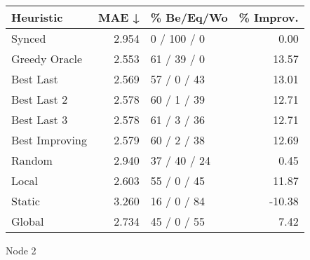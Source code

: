 \begin{tabular}{lrlr}
\toprule
\textbf{Heuristic} & \textbf{MAE ↓} & \textbf{\% Be/Eq/Wo} & \textbf{\% Improv.} \\
\midrule
            Synced &          2.954 &          0 / 100 / 0 &                0.00 \\
     Greedy Oracle &          2.553 &          61 / 39 / 0 &               13.57 \\
         Best Last &          2.569 &          57 / 0 / 43 &               13.01 \\
       Best Last 2 &          2.578 &          60 / 1 / 39 &               12.71 \\
       Best Last 3 &          2.578 &          61 / 3 / 36 &               12.71 \\
    Best Improving &          2.579 &          60 / 2 / 38 &               12.69 \\
            Random &          2.940 &         37 / 40 / 24 &                0.45 \\
             Local &          2.603 &          55 / 0 / 45 &               11.87 \\
            Static &          3.260 &          16 / 0 / 84 &              -10.38 \\
            Global &          2.734 &          45 / 0 / 55 &                7.42 \\
\bottomrule
\end{tabular}
\caption{Node 2}
\label{tab:ds_iid_lr01_le2_bs4_2}

